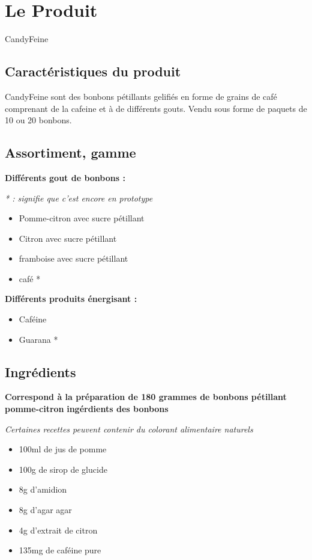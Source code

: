 \documentclass[12pt]{article}
\begin{document}
\section{Le Produit}
CandyFeine
\subsection{Caractéristiques du produit}
CandyFeine sont des bonbons pétillants gelifiés en forme de grains de café comprenant de la cafeine et à de différents gouts.
Vendu sous forme de paquets de 10 ou 20 bonbons.
\subsection{Assortiment, gamme}
\textbf{Différents gout de bonbons :}

\textit{* : signifie que c'est encore en prototype}
\begin{itemize}
 \item Pomme-citron avec sucre pétillant
 \item Citron avec sucre pétillant
 \item framboise avec sucre pétillant
 \item café *
\end{itemize}

\textbf{Différents produits énergisant :}
\begin{itemize}
 \item Caféine
 \item Guarana *
\end{itemize}

\subsection{Ingrédients}
\textbf{Correspond à la préparation de 180 grammes de bonbons pétillant pomme-citron}
\textbf{ingérdients des bonbons}

\textit{Certaines recettes peuvent contenir du colorant alimentaire naturels}
\begin{itemize}
 \item 100ml de jus de pomme
 \item 100g de sirop de glucide
 \item 8g d'amidion
 \item 8g d'agar agar
 \item 4g d'extrait de citron
 \item 135mg de caféine pure
\end{itemize}
\end{document}
